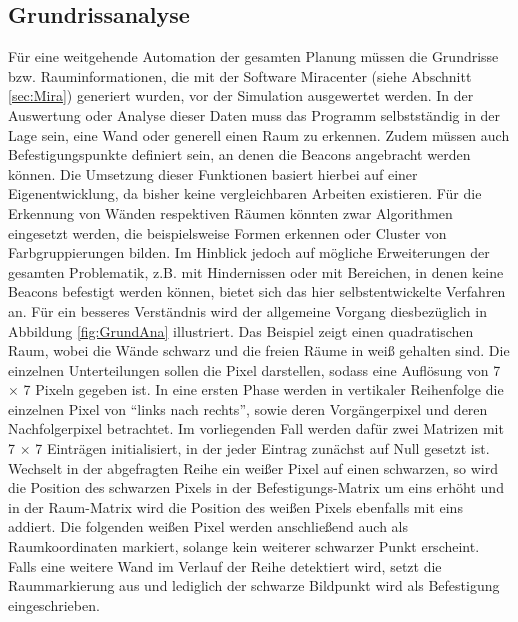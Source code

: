 \subsection{Grundrissanalyse}
Für eine weitgehende Automation der gesamten Planung müssen die Grundrisse bzw. Rauminformationen, die mit der Software Miracenter (siehe Abschnitt \ref{sec:Mira}) generiert wurden, vor der Simulation ausgewertet werden. In der Auswertung oder Analyse dieser Daten muss das Programm selbstständig in der Lage sein, eine Wand oder generell einen Raum zu erkennen. Zudem müssen auch Befestigungspunkte definiert sein, an denen die Beacons angebracht werden können. Die Umsetzung dieser Funktionen basiert hierbei auf einer Eigenentwicklung, da bisher keine vergleichbaren Arbeiten existieren. Für die Erkennung von Wänden respektiven Räumen könnten zwar Algorithmen eingesetzt werden, die beispielsweise Formen erkennen oder Cluster von Farbgruppierungen bilden. Im Hinblick jedoch auf mögliche Erweiterungen der gesamten Problematik, z.B. mit Hindernissen oder mit Bereichen, in denen keine Beacons befestigt werden können, bietet sich das hier selbstentwickelte Verfahren an. Für ein besseres Verständnis wird der allgemeine Vorgang diesbezüglich in Abbildung \ref{fig:GrundAna} illustriert. Das Beispiel zeigt einen quadratischen Raum, wobei die Wände schwarz und die freien Räume in weiß gehalten sind. Die einzelnen Unterteilungen sollen die Pixel darstellen, sodass eine Auflösung von 7 $\times$ 7 Pixeln gegeben ist. In eine ersten Phase werden in vertikaler Reihenfolge die einzelnen Pixel von "`links nach rechts"', sowie deren Vorgängerpixel und deren Nachfolgerpixel betrachtet. Im vorliegenden Fall werden dafür zwei Matrizen mit 7 $\times$ 7 Einträgen initialisiert, in der jeder Eintrag zunächst auf Null gesetzt ist. Wechselt in der abgefragten Reihe ein weißer Pixel auf einen schwarzen, so wird die Position des schwarzen Pixels in der Befestigungs-Matrix um eins erhöht und in der Raum-Matrix wird die Position des weißen Pixels ebenfalls mit eins addiert. Die folgenden weißen Pixel werden anschließend auch als Raumkoordinaten markiert, solange kein weiterer schwarzer Punkt erscheint. Falls eine weitere Wand im Verlauf der Reihe detektiert wird, setzt die Raummarkierung aus und lediglich der schwarze Bildpunkt wird als Befestigung eingeschrieben. \\ \\
